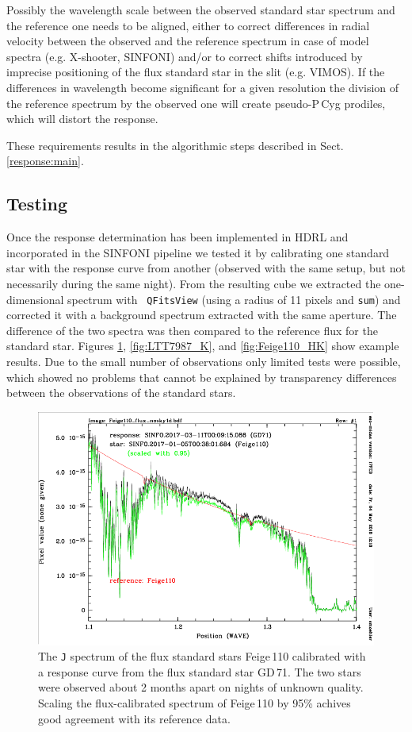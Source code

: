 Possibly the wavelength scale between the observed standard star
spectrum and the reference one needs to be aligned, either to correct
differences in radial velocity between the observed and the reference
spectrum in case of model spectra (e.g. X-shooter, SINFONI) and/or to
correct shifts introduced by imprecise positioning of the flux
standard star in the slit (e.g. VIMOS). If the differences in
wavelength become significant for a given resolution the division of
the reference spectrum by the observed one will create pseudo-P\,Cyg
prodiles, which will distort the response.

These requirements results in the algorithmic steps described in
Sect.\,\ref{response:main}.

\subsection{Testing}
Once the response determination has been implemented in HDRL and
incorporated in the SINFONI pipeline we tested it by calibrating one
standard star with the response curve from another (observed with the
same setup, but not necessarily during the same night). From the
resulting cube we extracted the one-dimensional spectrum with {\tt
  QFitsView} (using a radius of 11 pixels and {\tt sum}) and corrected
it with a background spectrum extracted with the same aperture. The
difference of the two spectra was then compared to the reference flux
for the standard star. Figures \ref{fig:Feige110_J},
\ref{fig:LTT7987_K}, and \ref{fig:Feige110_HK} show example
results. Due to the small number of observations only limited tests
were possible, which showed no problems that cannot be explained by
transparency differences between the observations of the standard stars.
 
\begin{figure}[H]
\centering \subfigure
\includegraphics[width=16cm]{figures/Feige110_J.png} 
\caption[]
	{\footnotesize  The {\tt J} spectrum of the flux standard stars
          Feige\,110 calibrated with a response curve from the flux
          standard star GD\,71. The two stars were observed about 2
          months apart on nights of unknown quality. Scaling the
          flux-calibrated spectrum of Feige\,110 by 95\% achives good
          agreement with its reference data.}
	\label{fig:Feige110_J}
\end{figure}

